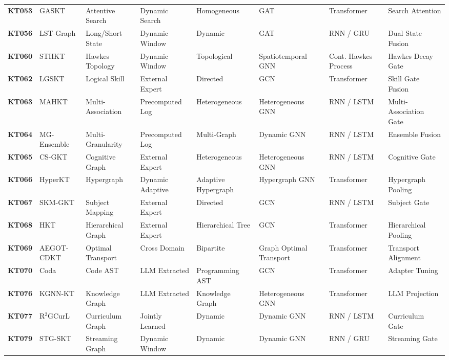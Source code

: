 \documentclass[journal]{IEEEtran}
\begin{document}
\begin{table}[t]
{\begin{tabular}{llllllll}
\textbf{KT053} & GASKT \cite{KT053_GASKT_2021} & Attentive Search & Dynamic Search & Homogeneous & GAT & Transformer & Search Attention \\
\textbf{KT056} & LST-Graph \cite{KT056_LSTGraph_2025} & Long/Short State & Dynamic Window & Dynamic & GAT & RNN / GRU & Dual State Fusion \\
\textbf{KT060} & STHKT \cite{KT060_STHKT_2025} & Hawkes Topology & Dynamic Window & Topological & Spatiotemporal GNN & Cont. Hawkes Process & Hawkes Decay Gate \\
\textbf{KT062} & LGSKT \cite{KT062_LGSKT_2025} & Logical Skill & External Expert & Directed & GCN & Transformer & Skill Gate Fusion \\
\textbf{KT063} & MAHKT \cite{KT063_MAHKT_2025} & Multi-Association & Precomputed Log & Heterogeneous & Heterogeneous GNN & RNN / LSTM & Multi-Association Gate \\
\textbf{KT064} & MG-Ensemble \cite{KT064_MGEnsemble_2025} & Multi-Granularity & Precomputed Log & Multi-Graph & Dynamic GNN & RNN / LSTM & Ensemble Fusion \\
\textbf{KT065} & CS-GKT \cite{KT065_CSGKT_2025} & Cognitive Graph & External Expert & Heterogeneous & Heterogeneous GNN & RNN / LSTM & Cognitive Gate \\
\textbf{KT066} & HyperKT \cite{KT066_HyperKT_2025} & Hypergraph & Dynamic Adaptive & Adaptive Hypergraph & Hypergraph GNN & Transformer & Hypergraph Pooling \\
\textbf{KT067} & SKM-GKT \cite{KT067_SKMGKT_2025} & Subject Mapping & External Expert & Directed & GCN & RNN / LSTM & Subject Gate \\
\textbf{KT068} & HKT \cite{KT068_HKT_2025} & Hierarchical Graph & External Expert & Hierarchical Tree & GCN & Transformer & Hierarchical Pooling \\
\textbf{KT069} & AEGOT-CDKT \cite{KT069_AEGOTCDKT_2025} & Optimal Transport & Cross Domain & Bipartite & Graph Optimal Transport & Transformer & Transport Alignment \\
\textbf{KT070} & Coda \cite{KT070_Coda_2025} & Code AST & LLM Extracted & Programming AST & GCN & Transformer & Adapter Tuning \\
\textbf{KT076} & KGNN-KT \cite{KT076_KGNNKT_2025} & Knowledge Graph & LLM Extracted & Knowledge Graph & Heterogeneous GNN & Transformer & LLM Projection \\
\textbf{KT077} & R$^2$GCurL \cite{KT077_R2GCurL_2026} & Curriculum Graph & Jointly Learned & Dynamic & Dynamic GNN & RNN / LSTM & Curriculum Gate \\
\textbf{KT079} & STG-SKT \cite{KT079_STGSKT_2026} & Streaming Graph & Dynamic Window & Dynamic & Dynamic GNN & RNN / GRU & Streaming Gate \\
\bottomrule
\end{tabular}
}
\end{table}
\end{document}
